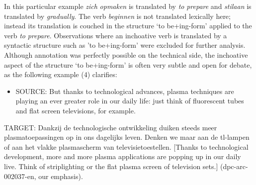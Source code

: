 In this particular example \textit{zich} \textit{opmaken} is translated by \textit{to} \textit{prepare} and \textit{stilaan} is translated by \textit{gradually}. The verb \textit{beginnen} is not translated lexically here; instead its translation is couched in the structure ‘to be+ing-form’ applied to the verb \textit{to} \textit{prepare}. Observations where an inchoative verb is translated by a syntactic structure such as 'to be+ing-form' were excluded for further analysis. Although annotation was perfectly possible on the technical side, the inchoative aspect of the structure ‘to be+ing-form’ is often very subtle \citep{smith_parameter_1997} and open for debate, as the following example (4) clarifies:


\begin{itemize}
\item \begin{styleVoorbeeld}
SOURCE: But thanks to technological advances, plasma techniques are playing an ever greater role in our daily life: just think of fluorescent tubes and flat screen televisions, for example.
\end{styleVoorbeeld}\end{itemize}
\begin{styleVoorbeeld}
TARGET: Dankzij de technologische ontwikkeling duiken steeds meer plasmatoepassingen op in ons dagelijks leven. Denken we maar aan de tl-lampen of aan het vlakke plasmascherm van televisietoestellen. [Thanks to technological development, more and more plasma applications are popping up in our daily live. Think of striplighting or the flat plasma screen of television sets.] (dpc-arc-002037-en, our emphasis).
\end{styleVoorbeeld}

